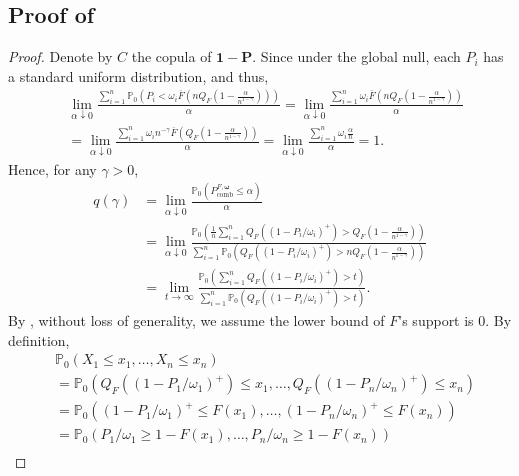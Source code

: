 \documentclass[12pt]{article}
\theoremstyle{plain}
\theoremstyle{plain}
\theoremstyle{definition}
\renewcommand{\Pr}{\mathbb{P}}
\begin{document}
\subsection{Proof of }
\label{subsec:proof-heavy-tailed-test-validity}
\AsymptoticValidity*
\begin{proof}
Denote by $C$ the copula of  $\mathbf{1}-\mathbf{P}$.
Since under the global null, each $P_i$ has a standard uniform distribution, and thus,
\begin{align*}
&\lim_{\alpha\downarrow0}\frac{\sum_{i=1}^n\Pr_0\left(P_i<\omega_i\overline{F}\left(n Q_F(1-\frac{\alpha}{n^{1-\gamma}})\right)\right)}{\alpha}
=\lim_{\alpha\downarrow0}\frac{\sum_{i=1}^n \omega_i\overline{F}\left(n Q_F(1-\frac{\alpha}{n^{1-\gamma}})\right)}{\alpha}\\
&=\lim_{\alpha\downarrow0}\frac{\sum_{i=1}^n \omega_i n^{-\gamma}\overline{F}\left(Q_F(1-\frac{\alpha}{n^{1-\gamma}})\right)}{\alpha}
=\lim_{\alpha\downarrow0}\frac{\sum_{i=1}^n \omega_i\frac{\alpha}{n}}{\alpha}=1.
\end{align*}
Hence, for any $\gamma>0$,
\begin{equation}
\label{eq:rewrite-q}
\begin{split}
q(\gamma)&=\lim_{\alpha\downarrow0}\frac{\Pr_0\left(P_\mathrm{comb}^{F, \bm \omega}\leq \alpha\right)}{\alpha}\\
&=\lim_{\alpha\downarrow0}\frac{\Pr_0\left(\frac{1}{n}\sum_{i=1}^n Q_F\left((1 - P_i/\omega_i)^+\right)> Q_F(1-\frac{\alpha}{n^{1-\gamma}})\right)}{\sum_{i=1}^n\Pr_0\left(Q_F\left((1 - P_i/\omega_i)^+\right)>n Q_F(1-\frac{\alpha}{n^{1-\gamma}})\right)}\\
&=\lim_{t\to\infty}\frac{\Pr_0\left(\sum_{i=1}^n Q_F\left((1 - P_i/\omega_i)^+\right)>t\right)}{\sum_{i=1}^n\Pr_0\left(Q_F\left((1 - P_i/\omega_i)^+\right)>t\right)}.  
\end{split}
\end{equation}
By , without loss of generality, we assume the lower bound of $F$'s support is 0.
By definition, 
\begin{align*}
&\Pr_0\left({X}_1\le x_1,\dots,{X}_n\le x_n\right)\\
&=\Pr_0\left(Q_{{F}}\left((1-P_1/\omega_1)^+\right)\le x_1,\dots,Q_{{F}}\left((1-P_n/\omega_n)^+\right)\le x_n\right)\\
&=\Pr_0\left((1-P_1/\omega_1)^+ \le {F}(x_1),\dots,(1-P_n/\omega_n)^+\le{F}(x_n)\right)\\
&=\Pr_0\left(P_1/\omega_1 \ge 1-{F}(x_1),\dots,P_n/\omega_n \ge 1-{F}(x_n)\right)\\

\end{align*}
\end{proof}
\end{document}
